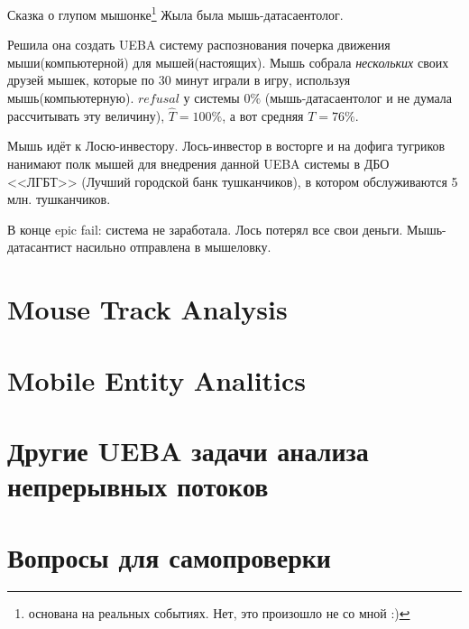 \begin{frame}{Сказка о глупом мышонке\footnote{основана на реальных событиях. Нет, это произошло не со мной :)}}
	\footnotesize
	Жыла была мышь-датасаентолог. 
	
	Решила она создать UEBA систему распознования почерка движения мыши(компьютерной) 
	для мышей(настоящих).  	
	Мышь собрала \textit{нескольких} своих друзей мышек, 
	которые по 30 минут играли в игру, используя мышь(компьютерную).
	$refusal$ у системы $0\%$ (мышь-датасаентолог и не думала рассчитывать эту величину),
	$\hat T = 100\%$, а вот средняя $T = 76\%$.
	
	Мышь идёт к Лосю-инвестору. Лось-инвестор в восторге
	и на дофига тугриков нанимают полк мышей для внедрения 
	данной UEBA системы
	в ДБО <<ЛГБТ>> (Лучший городской банк тушканчиков),
	в котором обслуживаются 5 млн. тушканчиков.
	
	В конце epic fail: система не заработала. 
	Лось потерял все свои деньги. Мышь-датасантист насильно отправлена в мышеловку.
	
\end{frame}

\begin{frame}

\end{frame}


\section{Mouse Track Analysis}\label{section:mca}


\section{Mobile Entity Analitics}\label{section:mea}

\section{Другие UEBA задачи анализа непрерывных потоков}\label{section:ueba_other}

\section{Вопросы для самопроверки}

